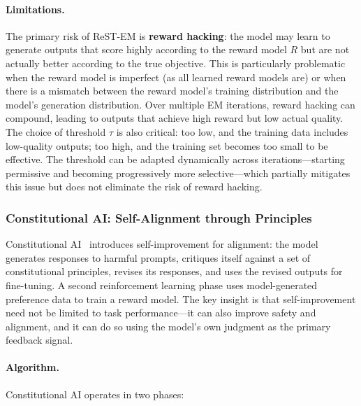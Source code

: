 \paragraph{Limitations.}
The primary risk of ReST-EM is \textbf{reward hacking}: the model may learn to generate outputs that score highly according to the reward model $R$ but are not actually better according to the true objective. This is particularly problematic when the reward model is imperfect (as all learned reward models are) or when there is a mismatch between the reward model's training distribution and the model's generation distribution. Over multiple EM iterations, reward hacking can compound, leading to outputs that achieve high reward but low actual quality. The choice of threshold $\tau$ is also critical: too low, and the training data includes low-quality outputs; too high, and the training set becomes too small to be effective. The threshold can be adapted dynamically across iterations---starting permissive and becoming progressively more selective---which partially mitigates this issue but does not eliminate the risk of reward hacking.


\subsubsection{Constitutional AI: Self-Alignment through Principles}
\label{sec:constitutional-ai}

Constitutional AI~\citep{bai2022constitutional} introduces self-improvement for alignment: the model generates responses to harmful prompts, critiques itself against a set of constitutional principles, revises its responses, and uses the revised outputs for fine-tuning. A second reinforcement learning phase uses model-generated preference data to train a reward model. The key insight is that self-improvement need not be limited to task performance---it can also improve safety and alignment, and it can do so using the model's own judgment as the primary feedback signal.

\paragraph{Algorithm.}
Constitutional AI operates in two phases:

